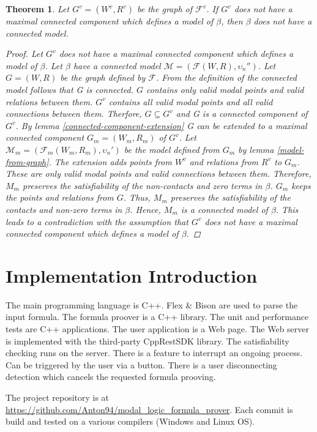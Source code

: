 \documentclass{article}
\newcommand\M{\mathcal{M}}
\newcommand\F{\mathcal{F}}
\newtheorem{theorem}{Theorem}[section]
\begin{document}
	\begin{theorem}
		Let $G^v=(W^v, R^v)$ be the graph of $\F^v$. If $G^v$ does not have a maximal connected component which defines a model of $\beta$, then $\beta$ does not have a connected model.
		\begin{proof}
			Let $G^v$ does not have a maximal connected component which defines a model of $\beta$. Let $\beta$ have a connected model $\M = (\F(W, R), \upsilon_n'')$. Let $G=(W, R)$ be the graph defined by $\F$. From the definition of the connected model follows that G is connected. $G$ contains only valid modal points and valid relations between them. $G^v$ contains all valid modal points and all valid connections between them. Therfore, $G \subseteq G^v$ and G is a connected component of $G^v$.
			By lemma \ref{connected-component-extension} G can be extended to a maximal connected component $G_m=(W_m, R_m)$ of $G^v$. Let $\M_m = (\F_m(W_m, R_m), \upsilon_n')$ be the model defined from $G_m$ by lemma \ref{model-from-graph}.
			The extension adds points from $W^v$ and relations from $R^v$ to $G_m$. These are only valid modal points and valid connections between them. Therefore, $M_m$ preserves the satisfiability of the non-contacts and zero terms in $\beta$. $G_m$ keeps the points and relations from $G$. Thus, $M_m$ preserves the satisfiability of the contacts and non-zero terms in $\beta$. Hence, $M_m$ is a connected model of $\beta$. This leads to a contradiction with the assumption that $G^v$ does not have a maximal connected component which defines a model of $\beta$.
		\end{proof}
	\end{theorem}

	\newpage
	\section{Implementation Introduction}
	The main programming language is C++. Flex \& Bison are used to parse the input formula. The formula proover is a C++ library. The unit and performance tests are C++ applications.
	The user application is a Web page. The Web server is implemented with the third-party CppRestSDK library. The satisfiability checking runs on the server. There is a feature to interrupt an ongoing process. Can be triggered by the user via a button. There is a user disconnecting detection which cancels the requested formula prooving.

	The project repository is at \url{https://github.com/Anton94/modal_logic_formula_prover}. Each commit is build and tested on a various compilers (Windows and Linux OS).
		
\end{document}
